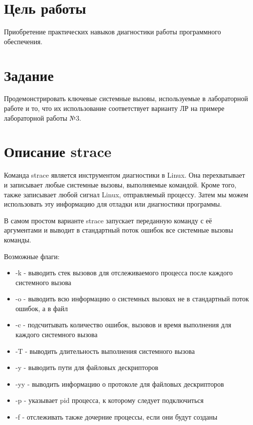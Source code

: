 \documentclass[a4paper, 12pt]{article}
\begin{document}
\section{Цель работы}
Приобретение практических навыков диагностики работы программного обеспечения.

\section{Задание}
Продемонстрировать ключевые 
системные вызовы, используемые в лабораторной работе и то, что их использование соответствует варианту ЛР на примере лабораторной работы №3.

\section{Описание strace}
 Команда strace является инструментом диагностики в Linux. Она перехватывает и записывает любые системные вызовы, выполняемые командой.  
Кроме того, также записывает любой сигнал Linux, отправляемый процессу. Затем мы можем использовать эту информацию для отладки или диагностики программы.

В самом простом варианте strace запускает переданную команду с её аргументами и выводит в стандартный поток ошибок все системные вызовы команды.

Возможные флаги:
\begin{itemize}
    \item -k - выводить стек вызовов для отслеживаемого процесса после каждого системного вызова
    \item -o - выводить всю информацию о системных вызовах не в стандартный поток ошибок, а в файл
    \item -c - подсчитывать количество ошибок, вызовов и время выполнения для каждого системного вызова
    \item -T - выводить длительность выполнения системного вызова
    \item -y - выводить пути для файловых дескрипторов
    \item -yy - выводить информацию о протоколе для файловых дескрипторов
    \item -p - указывает pid процесса, к которому следует подключиться
    \item -f - отслеживать также дочерние процессы, если они будут созданы
\end {itemize}


\newpage
\end{document}
